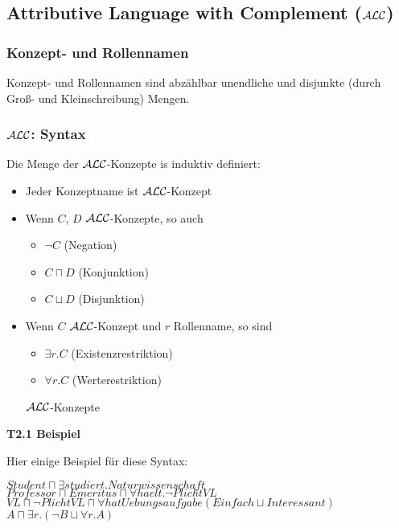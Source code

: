 \subsection{Attributive Language with Complement
(\texorpdfstring{$\mathcal{A}\mathcal{L}\mathcal{C}$}{ALC})}\label{attributive-language-with-complement-alc}

\subsubsection{Konzept- und Rollennamen}\label{konzept--und-rollennamen}

Konzept- und Rollennamen sind abzählbar unendliche und disjunkte (durch Groß- und Kleinschreibung) Mengen.

\subsubsection{\texorpdfstring{$\mathcal{A}\mathcal{L}\mathcal{C}$}{ALC}: Syntax}\label{alcsyntax}

\begin{definition}
  Die Menge der $\mathcal{A}\mathcal{L}\mathcal{C}$-Konzepte is induktiv definiert:
  \begin{itemize}
    \item Jeder Konzeptname ist $\mathcal{A}\mathcal{L}\mathcal{C}$-Konzept
    \item Wenn $C$, $D$ $\mathcal{A}\mathcal{L}\mathcal{C}$-Konzepte, so auch
    \begin{itemize}
      \item $\neg C$ \tabto{2cm}(Negation)
      \item $C \sqcap D$ \tabto{2cm}(Konjunktion)
      \item $C \sqcup D$ \tabto{2cm}(Disjunktion)
    \end{itemize}
    \item {Wenn $C$ $\mathcal{A}\mathcal{L}\mathcal{C}$-Konzept und $r$ Rollenname, so sind
    \begin{itemize}
      \item $\exists r.C$ \tabto{2cm}(Existenzrestriktion)
      \item $\forall r.C$ \tabto{2cm}(Werterestriktion)
    \end{itemize}
    $\mathcal{A}\mathcal{L}\mathcal{C}$-Konzepte}
  \end{itemize}
\end{definition}

\textbf{T2.1 Beispiel}

Hier einige Beispiel für diese Syntax:

\begin{center}
$Student \sqcap \exists studiert.Naturwissenschaft$ \\
$Professor \sqcap Emeritus \sqcap \forall haelt.\neg PlichtVL$ \\
$VL \sqcap \neg PlichtVL \sqcap \forall hatUebungsaufgabe(Einfach \sqcup Interessant)$ \\
$A \sqcap \exists r.(\neg B \sqcup \forall r.A)$
\end{center}

